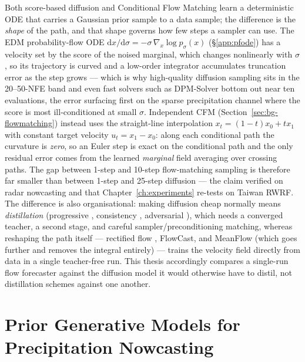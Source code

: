 Both score-based diffusion and Conditional Flow Matching learn a deterministic ODE that carries a Gaussian prior sample to a data sample; the difference is the \emph{shape} of the path, and that shape governs how few steps a sampler can use. The EDM probability-flow ODE $\mathrm{d}x/\mathrm{d}\sigma = -\sigma\,\nabla_x\log p_\sigma(x)$ (\S\ref{app:pfode}) has a velocity set by the score of the noised marginal, which changes nonlinearly with $\sigma$, so its trajectory is curved and a low-order integrator accumulates truncation error as the step grows --- which is why high-quality diffusion sampling sits in the 20--50-NFE band and even fast solvers such as DPM-Solver \citep{lu2022dpmsolver} bottom out near ten evaluations, the error surfacing first on the sparse precipitation channel where the score is most ill-conditioned at small $\sigma$. Independent CFM (Section~\ref{sec:bg-flowmatching}) instead uses the straight-line interpolation $x_t = (1-t)x_0 + t x_1$ with constant target velocity $u_t = x_1 - x_0$: along each conditional path the curvature is \emph{zero}, so an Euler step is exact on the conditional path and the only residual error comes from the learned \emph{marginal} field averaging over crossing paths. The gap between 1-step and 10-step flow-matching sampling is therefore far smaller than between 1-step and 25-step diffusion --- the claim \citet{ribeiro2025flowcast} verified on radar nowcasting and that Chapter~\ref{ch:experiments} re-tests on Taiwan RWRF. The difference is also organisational: making diffusion cheap normally means \emph{distillation} (progressive \citep{salimans2022progressive}, consistency \citep{song2023consistency,song2023improved}, adversarial \citep{sauer2023add}), which needs a converged teacher, a second stage, and careful sampler/preconditioning matching, whereas reshaping the path itself --- rectified flow \citep{liu2022rectifiedflow}, FlowCast, and MeanFlow \citep{geng2025meanflow} (which goes further and removes the integral entirely) --- trains the velocity field directly from data in a single teacher-free run. This thesis accordingly compares a single-run flow forecaster against the diffusion model it would otherwise have to distil, not distillation schemes against one another.

\section{Prior Generative Models for Precipitation Nowcasting}
\label{sec:bg-prior-weather}

